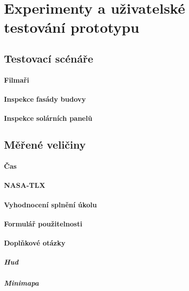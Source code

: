 \chapter{Experimenty a uživatelské testování prototypu}

\section{Testovací scénáře}

\subsubsection{Filmaři}
\subsubsection{Inspekce fasády budovy}
\subsubsection{Inspekce solárních panelů}

\section{Měřené veličiny}
\subsubsection{Čas}
\subsubsection{NASA-TLX}
\subsubsection{Vyhodnocení splnění úkolu}
\subsubsection{Formulář použitelnosti}
\subsubsection{Doplňkové otázky}

\paragraph{Hud}
\paragraph{Minimapa}
